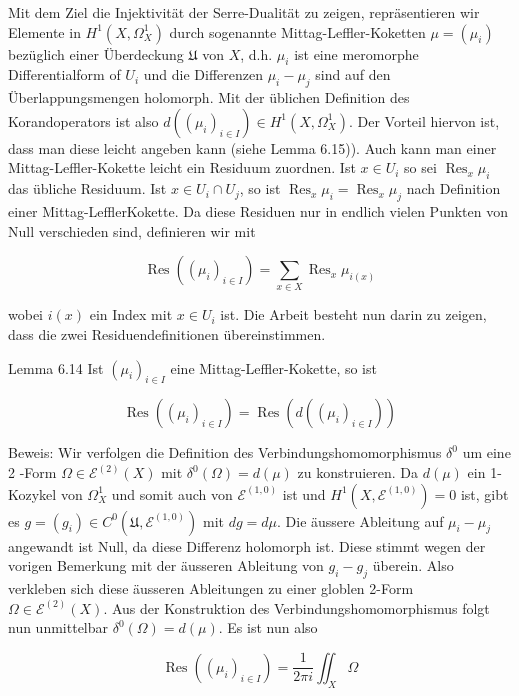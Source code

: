 \documentclass[10pt, letterpaper]{article}
\begin{document}
Mit dem Ziel die Injektivität der Serre-Dualität zu zeigen, repräsentieren wir Elemente in $H^{1}\left(X, \Omega_{X}^{1}\right)$ durch sogenannte Mittag-Leffler-Koketten $\mu=\left(\mu_{i}\right)$ bezüglich einer Überdeckung $\mathfrak{U}$ von $X$, d.h. $\mu_{i}$ ist eine meromorphe Differentialform of $U_{i}$ und die Differenzen $\mu_{i}-\mu_{j}$ sind auf den Überlappungsmengen holomorph. Mit der üblichen Definition des Korandoperators ist also $d\left(\left(\mu_{i}\right)_{i \in I}\right) \in H^{1}\left(X, \Omega_{X}^{1}\right)$. Der Vorteil hiervon ist, dass man diese leicht angeben kann (siehe Lemma 6.15)). Auch kann man einer Mittag-Leffler-Kokette leicht ein Residuum zuordnen. Ist $x \in U_{i}$ so sei $\operatorname{Res}_{x} \mu_{i}$ das übliche Residuum. Ist $x \in U_{i} \cap U_{j}$, so ist $\operatorname{Res}_{x} \mu_{i}=\operatorname{Res}_{x} \mu_{j}$ nach Definition einer Mittag-LefflerKokette. Da diese Residuen nur in endlich vielen Punkten von Null verschieden sind, definieren wir mit

$$
\operatorname{Res}\left(\left(\mu_{i}\right)_{i \in I}\right)=\sum_{x \in X} \operatorname{Res}_{x} \mu_{i(x)}
$$

wobei $i(x)$ ein Index mit $x \in U_{i}$ ist. Die Arbeit besteht nun darin zu zeigen, dass die zwei Residuendefinitionen übereinstimmen.

Lemma 6.14 Ist $\left(\mu_{i}\right)_{i \in I}$ eine Mittag-Leffler-Kokette, so ist

$$
\operatorname{Res}\left(\left(\mu_{i}\right)_{i \in I}\right)=\operatorname{Res}\left(d\left(\left(\mu_{i}\right)_{i \in I}\right)\right)
$$

Beweis: Wir verfolgen die Definition des Verbindungshomomorphismus $\delta^{0}$ um eine 2 -Form $\Omega \in \mathcal{E}^{(2)}(X)$ mit $\delta^{0}(\Omega)=d(\mu)$ zu konstruieren. Da $d(\mu)$ ein 1-Kozykel von $\Omega_{X}^{1}$ und somit auch von $\mathcal{E}^{(1,0)}$ ist und $H^{1}\left(X, \mathcal{E}^{(1,0)}\right)=0$ ist, gibt es $g=\left(g_{i}\right) \in C^{0}\left(\mathfrak{U}, \mathcal{E}^{(1,0)}\right)$ mit $d g=d \mu$. Die äussere Ableitung auf $\mu_{i}-\mu_{j}$ angewandt ist Null, da diese Differenz holomorph ist. Diese stimmt wegen der vorigen Bemerkung mit der äusseren Ableitung von $g_{i}-g_{j}$ überein. Also verkleben sich diese äusseren Ableitungen zu einer globlen 2-Form $\Omega \in \mathcal{E}^{(2)}(X)$. Aus der Konstruktion des Verbindungshomomorphismus folgt nun unmittelbar $\delta^{0}(\Omega)=d(\mu)$. Es ist nun also

$$
\operatorname{Res}\left(\left(\mu_{i}\right)_{i \in I}\right)=\frac{1}{2 \pi i} \iint_{X} \Omega
$$
\end{document}
